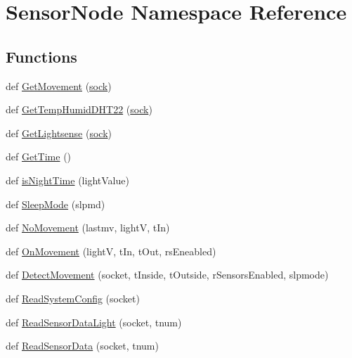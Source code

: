 \hypertarget{namespaceSensorNode}{}\section{Sensor\+Node Namespace Reference}
\label{namespaceSensorNode}
\subsection*{Functions}
\begin{DoxyCompactItemize}
\item 
def \hyperlink{namespaceSensorNode_a683ee2ba850b73248e0e9d4e1c15c844}{Get\+Movement} (\hyperlink{namespaceSensorNode_a7a84ed25b4a6ec5b5008e9ebea3653dc}{sock})
\item 
def \hyperlink{namespaceSensorNode_a8920dec9e244a89bd8d0d2b9910bec75}{Get\+Temp\+Humid\+D\+H\+T22} (\hyperlink{namespaceSensorNode_a7a84ed25b4a6ec5b5008e9ebea3653dc}{sock})
\item 
def \hyperlink{namespaceSensorNode_a5e804ff447fc7771e2c1454eb0425097}{Get\+Lightsense} (\hyperlink{namespaceSensorNode_a7a84ed25b4a6ec5b5008e9ebea3653dc}{sock})
\item 
def \hyperlink{namespaceSensorNode_a7071f7e3398ab91418cd1096210129a0}{Get\+Time} ()
\item 
def \hyperlink{namespaceSensorNode_ac1b36fd1dc3beec8749f75f6d3944899}{is\+Night\+Time} (light\+Value)
\item 
def \hyperlink{namespaceSensorNode_a8414adaa25d1a17a9043d673c751c256}{Sleep\+Mode} (slpmd)
\item 
def \hyperlink{namespaceSensorNode_a4b7927f47889ab334c1ce571de952088}{No\+Movement} (lastmv, lightV, t\+In)
\item 
def \hyperlink{namespaceSensorNode_add0e17d3b4b233162ff03c9ba9acc3ab}{On\+Movement} (lightV, t\+In, t\+Out, rs\+Eneabled)
\item 
def \hyperlink{namespaceSensorNode_a8281cee319c91445e41e2beb456b063d}{Detect\+Movement} (socket, t\+Inside, t\+Outside, r\+Sensors\+Enabled, slpmode)
\item 
def \hyperlink{namespaceSensorNode_aa3b036956df80a6daa599e1957a1cd57}{Read\+System\+Config} (socket)
\item 
def \hyperlink{namespaceSensorNode_a17cde606b5329ad7081ae3408e6d6032}{Read\+Sensor\+Data\+Light} (socket, tnum)
\item 
def \hyperlink{namespaceSensorNode_ad5ea37debfca3a6ca63a67e1b9fe065a}{Read\+Sensor\+Data} (socket, tnum)
\item 

\end{DoxyCompactItemize}
